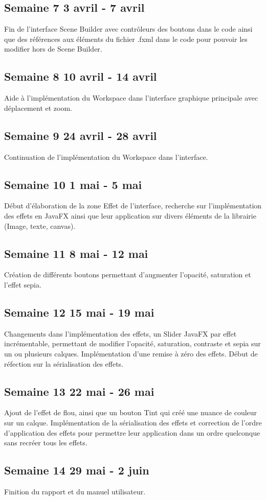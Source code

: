 \subsection{Semaine 7 3 avril - 7 avril}
Fin de l'interface Scene Builder avec contrôleurs des boutons dans le code ainsi que des références aux éléments du fichier \og .fxml \fg{} dans le code pour pouvoir les modifier hors de Scene Builder.
\subsection{Semaine 8 10 avril - 14 avril}
Aide à l'implémentation du Workspace dans l'interface graphique principale avec déplacement et zoom.
\subsection{Semaine 9 24 avril - 28 avril}
Continuation de l'implémentation du Workspace dans l'interface.
\subsection{Semaine 10 1 mai - 5 mai}
Début d'élaboration de la zone \og Effet \fg{} de l'interface, recherche sur l'implémentation des effets en JavaFX ainsi que leur application sur divers éléments de la librairie (Image, texte, canvas).
\subsection{Semaine 11 8 mai - 12 mai} 
Création de différents boutons permettant d'augmenter l'opacité, saturation et l'effet sepia. 
\subsection{Semaine 12 15 mai - 19 mai}
Changements dans l'implémentation des effets, un \og Slider \fg{} JavaFX par effet incrémentable, permettant de modifier l'opacité, saturation, contraste et sepia sur un ou plusieurs calques. Implémentation d'une remise à zéro des effets. Début de réfection sur la sérialisation des effets.
\subsection{Semaine 13 22 mai - 26 mai}
Ajout de l'effet de flou, ainsi que un bouton \og Tint \fg{} qui créé une nuance de couleur sur un calque. Implémentation de la sérialisation des effets et correction de l'ordre d'application des effets pour permettre leur application dans un ordre quelconque sans recréer tous les effets.
\subsection{Semaine 14 29 mai - 2 juin}
Finition du rapport et du manuel utilisateur.



